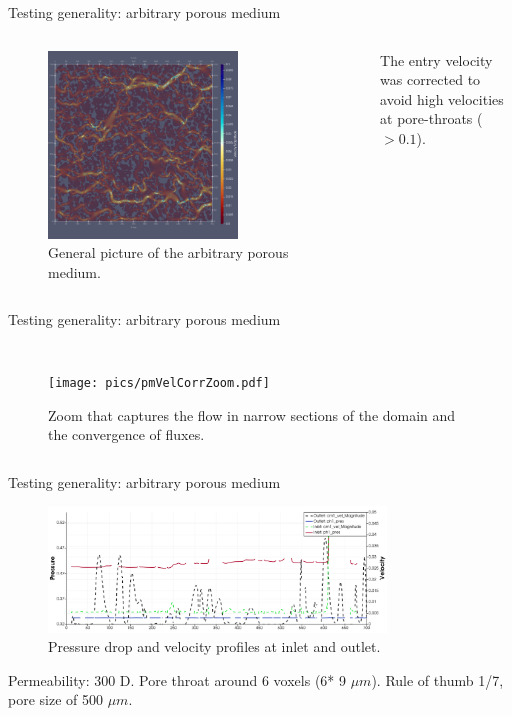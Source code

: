 \documentclass{beamer}
\begin{document}
	\begin{frame}{Testing generality: arbitrary porous medium}
		\begin{columns}
			\begin{figure}
				\centering
				\includegraphics[width=0.7\textwidth]{pics/pmVelLowV.png}
				\caption{General picture of the arbitrary porous medium.}   
			\end{figure}
			The entry velocity was corrected to avoid high velocities at pore-throats ($>0.1$).
		\end{columns}
	\end{frame}
	
	\begin{frame}{Testing generality: arbitrary porous medium}
		\begin{columns}
			\column{0.7\textwidth}
			\begin{figure}
				\centering
				\texttt{[image: pics/pmVelCorrZoom.pdf]}
				\caption{Zoom that captures the flow in narrow sections of the domain and the convergence of fluxes.}   
			\end{figure}
			\column{0.3\textwidth}
			 
		\end{columns}
	\end{frame}
	
	\begin{frame}{Testing generality: arbitrary porous medium}

			\begin{figure}
				\centering
				\includegraphics[width=0.8\textwidth]{pics/pmDrops.png}
				\caption{Pressure drop and velocity profiles at inlet and outlet.}   
			\end{figure}
			Permeability: 300 D. Pore throat around 6 voxels (6* 9 $\mu m$). Rule of thumb 1/7, pore size of 500 $\mu m$.
	\end{frame}
	
\end{document}
